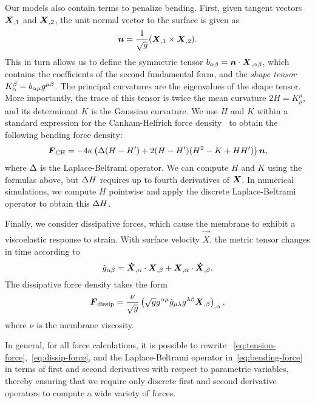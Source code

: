 Our models also contain terms to penalize bending. First, given tangent vectors $\boldsymbol{X}_{,1}$ and $\boldsymbol{X}_{,2}$, the unit normal vector to the surface is given as
\begin{equation}\label{eq:unit-normal}
\boldsymbol{n} = \frac{1}{\sqrt{g}} (\boldsymbol{X}_{,1}\times\boldsymbol{X}_{,2}).
\end{equation}
This in turn allows us to define the symmetric tensor $b_{\alpha\beta} = \boldsymbol{n}\cdot\boldsymbol{X}_{,\alpha\beta}$, which contains the coefficients of the second fundamental form, and the \emph{shape tensor} $K_\alpha^\beta = b_{\alpha\mu}g^{\mu\beta}$. The principal curvatures are the eigenvalues of the shape tensor. More importantly, the trace of this tensor is twice the mean curvature $2H = K_\mu^\mu$, and its determinant $K$ is the Gaussian curvature. We use $H$ and $K$ within a standard expression for the Canham-Helfrich force density~\cite{Zhongcan:1989ue} to obtain the following bending force density:
\begin{equation}\label{eq:bending-force}
\boldsymbol{F}_\text{CH} = -4\kappa\left(\Delta(H-H')+2(H-H')(H^2-K+HH')\right)\boldsymbol{n},
\end{equation}
where $\Delta$ is the Laplace-Beltrami operator. We can compute $H$ and $K$ using the
formulas above, but $\Delta H$ requires up to fourth derivatives of $\boldsymbol{X}$. In numerical simulations, we compute $H$ pointwise and apply the discrete
Laplace-Beltrami operator to obtain this $\Delta H$.

Finally, we consider dissipative forces, which cause the membrane to exhibit a
viscoelastic response to strain. With surface velocity $\vec{\dot{X}}$, the metric tensor
changes in time according to 
\begin{equation}
    \dot{g}_{\alpha\beta} = \boldsymbol{\dot{X}}_{,\alpha}\cdot\boldsymbol{X}_{,\beta} + \boldsymbol{X}_{,\alpha}\cdot\boldsymbol{\dot{X}}_{,\beta}.
\end{equation}
The dissipative force density takes the form~\cite{Rangamani:2012hi}
\begin{equation}\label{eq:dissip-force}
    \boldsymbol{F}_\text{dissip} = \frac{\nu}{\sqrt{g}}\left(\sqrt{g}g^{\alpha\mu}\dot{g}_{\mu\lambda}g^{\lambda\beta}\boldsymbol{X}_{,\beta}\right)_{,\alpha},
\end{equation}
where $\nu$ is the membrane viscosity. 

In general, for all force calculations, it is possible to rewrite ~\eqref{eq:tension-force},~\eqref{eq:dissip-force}, and the Laplace-Beltrami
operator in~\eqref{eq:bending-force} in terms of first and second derivatives with
respect to parametric variables, thereby ensuring that we require only discrete first and second derivative operators to compute a wide variety of forces.

